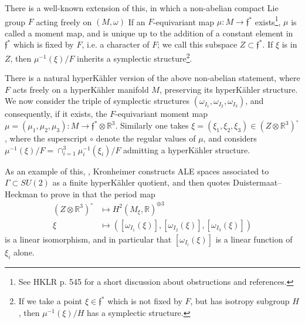 \documentclass[12pt,letterpaper,reqno]{amsart}
\theoremstyle{remark}
\theoremstyle{definition}
\numberwithin{thm}{section}
\numberwithin{equation}{section}
\numberwithin{figure}{section}
\newcommand{\R}{\ensuremath{\mathbb R}}
\begin{document}
\smallskip

There is a well-known extension of this, in which a non-abelian compact Lie group $F$ acting freely on $(M, \omega)$ 
If an $F$-equivariant map $\mu: M \to \mathfrak{f}^*$ exists\footnote{See HKLR p. 545 for a short discussion about obstructions and references.}, $\mu$ is called a moment map, and is unique up to the addition of a constant element in $\mathfrak{f}^*$ which is fixed by $F$, i.e. a character of $F$; we call this subspace $Z \subset \mathfrak{f}^*$.  If $\xi$ is in $Z$,
then $\mu^{-1}(\xi)/F$ inherits a symplectic structure\footnote{If we take a point $\xi \in \mathfrak{f}^*$ which is not fixed by $F$, but has isotropy subgroup $H$, then $\mu^{-1}(\xi)/H$ has a symplectic structure.}.

\smallskip

There is a natural hyperK\"ahler version of the above non-abelian statement, where $F$ acts freely on a hyperK\"ahler manifold $M$, preserving its hyperK\"ahler structure. We now consider the triple of symplectic structures $(\omega_{I_1}, \omega_{I_2}, \omega_{I_3})$, and consequently, if it exists, the $F$-equivariant moment map $\mu=(\mu_1, \mu_2, \mu_3): M \to  \mathfrak{f}^* \otimes \R^3$. Similarly one takes $ \xi = (\xi_1, \xi_2, \xi_3) \in (Z \otimes \R^3)^\circ$, where the superscript $\circ$ denote the regular values of $\mu$, and considers $\mu^{-1}(\xi)/F = \cap_{i=1}^3 \mu_i^{-1}(\xi_i)/F$ admitting a hyperK\"ahler structure.

As an example of this, \cite{Kronheimerconstruction}, Kronheimer constructs ALE spaces associated to $\Gamma \subset SU(2)$ as a finite hyperK\"ahler quotient, and then quotes Duistermaat--Heckman to prove in \cite[Proposition 4.1i]{Kronheimerconstruction} that the period map 
\begin{align*}
(Z \otimes \R^3)^\circ &\mapsto H^2(M_\xi, \R)^{\oplus 3} \\
\xi &\mapsto ([\omega_{I_1}(\xi)], [\omega_{I_2}(\xi)], [\omega_{I_3}(\xi)])
\end{align*}
is a linear isomorphism, and in particular that $[\omega_{I_i}(\xi)]$ is a linear function of $\xi_i$ alone.


\bigskip
\end{document}
